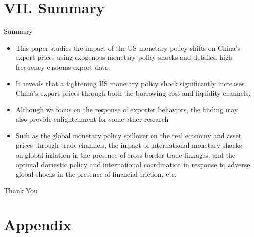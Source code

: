 \documentclass[10pt]{beamer}
\begin{document}






\section{VII. Summary}

\begin{frame}{Summary}

\begin{itemize}
\item This paper studies the impact of the US monetary policy shifts on China's export prices using exogenous monetary policy shocks and detailed high-frequency customs export data. 
\item It reveals that a tightening US monetary policy shock significantly increases China's export prices through both the borrowing cost and liquidity channels.
\item Although we focus on the response of exporter behaviors, the finding may also provide enlightenment for some other research
\item Such as the global monetary policy spillover on the real economy and asset prices through trade channels, the impact of international monetary shocks on global inflation in the presence of cross-border trade linkages, and the optimal domestic policy and international coordination in response to adverse global shocks in the presence of financial friction, etc.
\end{itemize}

\end{frame}



\begin{frame}{}
  \centering \Huge
   Thank You
\end{frame}






\section{Appendix}
\end{document}
